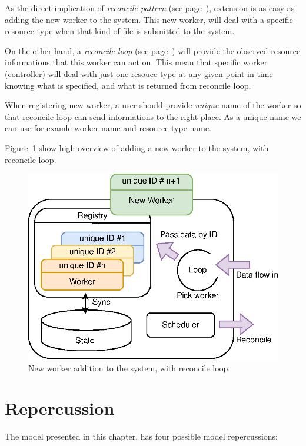 As the direct implication of \emph{reconcile pattern} (see page~\pageref{loop_pattenr}), extension is as easy as adding the new worker to the system. This new worker, will deal with a specific resource type when that kind of file is submitted to the system.

On the other hand, a \emph{reconcile loop} (see page~\pageref{reconcile_loop}) will provide the observed resource informations that this worker can act on. This mean that specific worker (controller) will deal with just one resouce type at any given point in time knowing what is specified, and what is returned from reconcile loop. 

When registering new worker, a user should provide \emph{unique} name of the worker so that reconcile loop can send informations to the right place. As a unique name we can use for examle worker name and resource type name.

Figure~\ref{fig:fig30} show high overview of adding a new worker to the system, with reconcile loop.

\begin{figure}[H]
	\begin{center}
		\includegraphics[scale=0.7]{images/Figure30}
	\end{center}
	\vspace{-0.7cm}
	\caption{New worker addition to the system, with reconcile loop.}
	\label{fig:fig30}
\end{figure}
%
%
\section{Repercussion}\label{sec:repercussion}
%
The model presented in this chapter, has four possible model repercussions:

